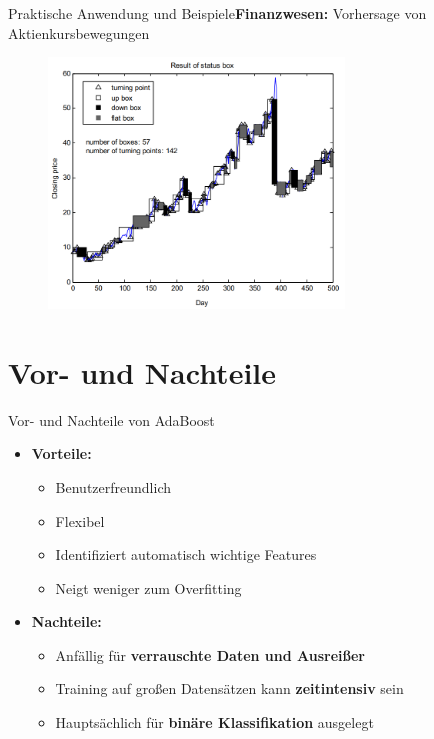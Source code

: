 \documentclass[hyperref={bookmarks=false},11pt,dvipsnames]{beamer}
\begin{document}
\begin{frame}{Praktische Anwendung und Beispiele}{\textbf{Finanzwesen:} Vorhersage von Aktienkursbewegungen}
	\begin{figure}
		\centering
		\includegraphics[width=0.7\textwidth]{../Ausarbeitung/figures/stock.png}
	\end{figure}
\end{frame}

\section{Vor- und Nachteile}
\begin{frame}{Vor- und Nachteile von AdaBoost}
	\begin{itemize}
		\item <1-> []\textbf{Vorteile:}\\[5pt]
		      \begin{itemize}
			      \item<2-> [\textbf{\textcolor{buwgreen}{+}}] Benutzerfreundlich
			      \item<3-> [\textbf{\textcolor{buwgreen}{+}}] Flexibel
			      \item<4-> [\textbf{\textcolor{buwgreen}{+}}] Identifiziert automatisch wichtige Features
			      \item<5-> [\textbf{\textcolor{buwgreen}{+}}] Neigt weniger zum Overfitting
		      \end{itemize}
		\item <6-> [] \textbf{Nachteile:}\\[5pt]
		      \begin{itemize}
			      \item<7-> [\textbf{\textcolor{darkred}{-}}] Anfällig für \textbf{verrauschte Daten und Ausreißer}
			      \item<8-> [\textbf{\textcolor{darkred}{-}}] Training auf großen Datensätzen kann \textbf{zeitintensiv} sein
			      \item<9-> [\textbf{\textcolor{darkred}{-}}] Hauptsächlich für \textbf{binäre Klassifikation} ausgelegt
		      \end{itemize}
	\end{itemize}
\end{frame}
\end{document}
